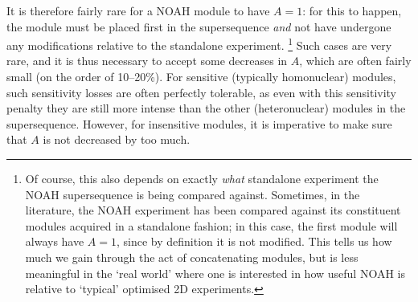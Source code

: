 It is therefore fairly rare for a NOAH module to have $A = 1$: for this to happen, the module must be placed first in the supersequence \textit{and} not have undergone any modifications relative to the standalone experiment.%
\footnote{Of course, this also depends on exactly \textit{what} standalone experiment the NOAH supersequence is being compared against. Sometimes, in the literature, the NOAH experiment has been compared against its constituent modules acquired in a standalone fashion; in this case, the first module will always have $A = 1$, since by definition it is not modified. This tells us how much we gain through the act of concatenating modules, but is less meaningful in the `real world' where one is interested in how useful NOAH is relative to `typical' optimised 2D experiments.}
Such cases are very rare, and it is thus necessary to accept some decreases in $A$, which are often fairly small (on the order of 10--20\%).
For sensitive (typically homonuclear) modules, such sensitivity losses are often perfectly tolerable, as even with this sensitivity penalty they are still more intense than the other (heteronuclear) modules in the supersequence.
However, for insensitive modules, it is imperative to make sure that $A$ is not decreased by too much.
